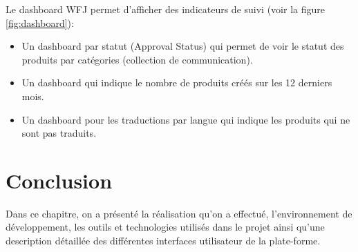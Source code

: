 Le dashboard WFJ permet d’afficher des indicateurs de suivi (voir la figure \ref{fig:dashboard}):

\begin{itemize}
    \item Un dashboard par statut (Approval Status) qui permet de voir le statut des produits par catégories (collection de communication).
    \smallskip
    \item Un dashboard qui indique le nombre de produits créés sur les 12 derniers mois.
    \smallskip
    \item Un dashboard pour les traductions par langue qui indique les produits qui ne sont pas traduits.
    
\end{itemize}



 


\section{Conclusion}
Dans ce chapitre, on a présenté la réalisation qu'on a effectué, l’environnement de développement, les outils et technologies utilisés dans le projet ainsi qu'une description détaillée des différentes interfaces utilisateur de la plate-forme.


